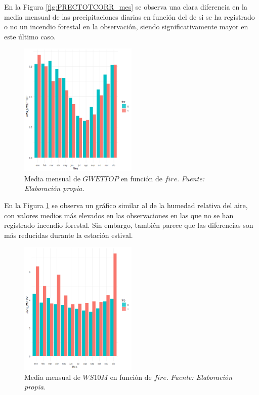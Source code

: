 \documentclass[12pt,a4paper,]{book}
\numberwithin{dummy}{section}
\theoremstyle{ocrenumbox}
\theoremstyle{blacknumex}
\theoremstyle{blacknumbox}
\theoremstyle{ocrenum}
\theoremstyle{ocrenum}
\begin{document}
En la Figura \ref{fig:PRECTOTCORR_mes} se observa una clara diferencia
en la media mensual de las precipitaciones diarias en función del de si
se ha registrado o no un incendio forestal en la observación, siendo
significativamente mayor en este último caso.

\begin{figure}[H]
\centering
\includegraphics[width =0.5\textwidth]{graficos/GWETTOP_mes.png}
\caption{Media mensual de $GWETTOP$ en función de $fire$. \it Fuente: Elaboración propia.}
\label{fig:GWETTOP_mes}
\end{figure}

En la Figura \ref{fig:GWETTOP_mes} se observa un gráfico similar al de
la humedad relativa del aire, con valores medios más elevados en las
observaciones en las que no se han registrado incendio forestal. Sin
embargo, también parece que las diferencias son más reducidas durante la
estación estival.

\begin{figure}[H]
\centering
\includegraphics[width = 0.5\textwidth]{graficos/WS10M_mes.png}
\caption{Media mensual de $WS10M$ en función de $fire$. \it Fuente: Elaboración propia.}
\label{fig:WS10M_mes}
\end{figure}
\end{document}
